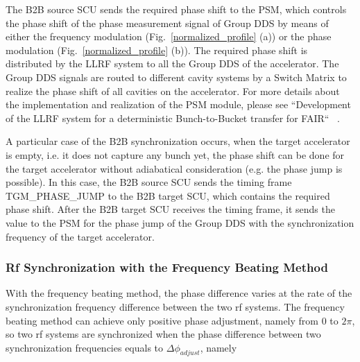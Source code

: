 The B2B source SCU sends the required phase shift to the \gls{PSM}, which controls the phase shift of the phase measurement signal of Group DDS by means of either the frequency modulation (Fig.~\ref{normalized_profile} (a)) or the phase modulation (Fig.~\ref{normalized_profile} (b)). The required phase shift is distributed by the LLRF system to all the Group DDS of the accelerator. The Group DDS signals are routed to different cavity systems by a Switch Matrix to realize the phase shift of all cavities on the accelerator. For more details about the implementation and realization of the PSM module, please see ``Development of the LLRF system for a deterministic Bunch-to-Bucket transfer for FAIR`` ~\cite{ferrand_development_nodate}.

A particular case of the B2B synchronization occurs, when the target accelerator is empty, i.e. it does not capture any bunch yet, the phase shift can be done for the target accelerator without adiabatical consideration (e.g. the phase jump is possible). In this case, the B2B source SCU sends the timing frame TGM\_PHASE\_JUMP to the B2B target SCU, which contains the required phase shift. After the B2B target SCU receives the timing frame, it sends the value to the PSM for the phase jump of the Group DDS with the synchronization frequency of the target accelerator.

\subsubsection{Rf Synchronization with the Frequency Beating Method}

With the frequency beating method, the phase difference varies at the rate of the synchronization frequency difference between the two rf systems. The frequency beating method can achieve only positive phase adjustment, namely from 0 to $2\pi$, so two rf systems are synchronized when the phase difference between two synchronization frequencies equals to $\Delta \phi_\mathit{adjust}$, namely
%
%
%
%

